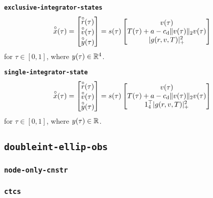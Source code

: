 \documentclass[11pt,a4paper]{article}
\begin{document}
\textbf{\texttt{exclusive-integrator-states}}
\begin{align}
    \overset{\circ}{x}(\tau) = \begin{bmatrix}
                        \overset{\circ}{r}(\tau) \\
                        \overset{\circ}{v}(\tau) \\
                        \overset{\circ}{y}(\tau) 
                     \end{bmatrix} = s(\tau)\begin{bmatrix}
                                        v(\tau) \\
                                        T(\tau) + a - c_{\mathrm{d}}\|v(\tau)\|_2v(\tau) \\
                                        |g(r,v,T)|_+^2
                                     \end{bmatrix}\label{dbl-intg-dilaugsys-exclu}
\end{align}
for $\tau\in[0,1]$, where $y(\tau)\in\mathbb{R}^{4}$.

\textbf{\texttt{single-integrator-state}}
\begin{align}
    \overset{\circ}{x}(\tau) = \begin{bmatrix}
                        \overset{\circ}{r}(\tau) \\
                        \overset{\circ}{v}(\tau) \\
                        \overset{\circ}{y}(\tau) 
                     \end{bmatrix} = s(\tau)\begin{bmatrix}
                                        v(\tau) \\
                                        T(\tau) + a - c_{\mathrm{d}}\|v(\tau)\|_2v(\tau) \\
                                        1_4^\top|g(r,v,T)|_+^2
                                     \end{bmatrix}\label{dbl-intg-dilaugsys-single}
\end{align}
for $\tau\in[0,1]$, where $y(\tau)\in\mathbb{R}^{}$.

\subsection{\texttt{doubleint-ellip-obs}}

\subsubsection{\texttt{node-only-cnstr}}

\subsubsection{\texttt{ctcs}}
\end{document}
